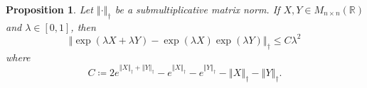 \documentclass[a4paper,11pt]{scrartcl}
\newcounter{dummy}
\numberwithin{dummy}{section}
\theoremstyle{plain}
\newtheorem{proposition}[dummy]{Proposition}
\theoremstyle{plain}
\theoremstyle{plain}
\theoremstyle{plain}
\theoremstyle{nonumberplain}
\newcommand{\F}[1][R]{\mathbb{#1}} %
\newcommand{\Ltwonorm}[1]{\left\Vert #1 \right\Vert} %
\begin{document}
	\begin{proposition}
		\label{ApproximateCumm1}
		Let $ \Ltwonorm{\cdot}_{\dag} $ be a submultiplicative matrix norm. 
		If $ X, Y \in M_{n\times n} (\F) $ and $ \lambda \in [0,1] $, then
		\begin{equation}
		\label{ApproximatelyCummutative}
		\Ltwonorm{\exp ( \lambda X + \lambda Y) - \exp (\lambda X) \exp (\lambda Y)}_{\dag}
		\le C \lambda^{2}
		\end{equation}
		where 
		\begin{equation}
		\label{ApproximatelyCummutativeConstant}
		C
		\coloneqq 2 e^{\Ltwonorm{X}_{\dag} + \Ltwonorm{Y}_{\dag}} - e^{\Ltwonorm{X}_{\dag}} - e^{\Ltwonorm{Y}_{\dag}} - \Ltwonorm{X}_{\dag} - \Ltwonorm{Y}_{\dag}.
		\end{equation}
	\end{proposition}
	
\end{document}
